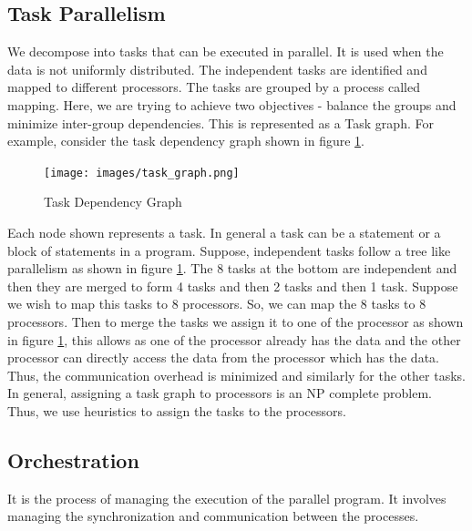 \documentclass[12pt]{article}
\begin{document}
\subsection{Task Parallelism}
We decompose into tasks that can be executed in parallel. It is used when the data is not uniformly distributed.
The independent tasks are identified and mapped to different processors. The tasks are grouped by a process called mapping. 
Here, we are trying to achieve two objectives - balance the groups and minimize inter-group dependencies.
This is represented as a Task graph. For example, consider the task dependency graph shown in figure 
\ref{fig:task_graph}.
\begin{figure}[H]
    \centering
    \texttt{[image: images/task\_graph.png]}
    \caption{Task Dependency Graph}
    \label{fig:task_graph}
\end{figure}
Each node shown represents a task. In general a task can be a statement or a block of statements in a program. 
Suppose, independent tasks follow a tree like parallelism as shown in figure \ref{fig:task_graph}.
The 8 tasks at the bottom are independent and then they are merged to form 4 tasks and then 2 tasks and then 1 task.
Suppose we wish to map this tasks to 8 processors. So, we can map the 8 tasks to 8 processors. Then to merge the tasks we assign it to one of the 
processor as shown in figure \ref{fig:task_graph}, this allows as one of the processor already has the data and the other processor 
can directly access the data from the processor which has the data. Thus, the communication overhead is minimized and similarly for the other tasks.
In general, assigning a task graph to processors is an NP complete problem. Thus, we use heuristics to assign the tasks to the processors.

\subsection{Orchestration}
It is the process of managing the execution of the parallel program. It involves managing the synchronization and communication between the processes.
\end{document}
